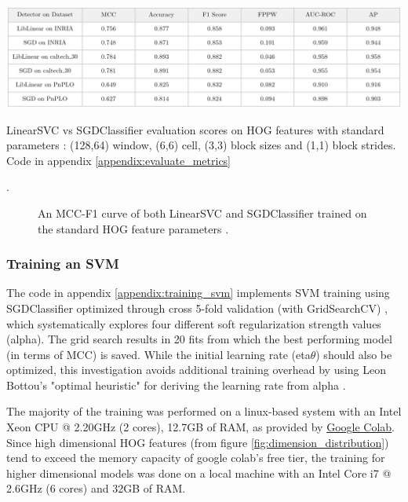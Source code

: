 \begin{table}
    \includegraphics[width=\linewidth]{images/liblinear_vs_sgd_table.png}
    \caption{LinearSVC vs SGDClassifier evaluation scores on HOG features with standard parameters \cite{dalal_2005_histograms}: (128,64) window, (6,6) cell, (3,3) block sizes and (1,1) block strides. Code in appendix \ref{appendix:evaluate_metrics}}
    \label{tab:liblinear_vs_sgd_table}. 
\end{table}


\begin{figure}
    \centering
    
    \caption{An MCC-F1 curve of both LinearSVC and SGDClassifier trained on the standard HOG feature parameters \cite{dalal_2005_histograms}. \protect\footnotemark}
    \label{fig:liblinear_vs_sgd_curve}
\end{figure}


\subsubsection{Training an SVM}

The code in appendix \ref{appendix:training_svm} implements SVM training using SGDClassifier optimized through cross 5-fold validation (with GridSearchCV) \cite{cornell_hyperoptimization}, which systematically explores four different soft regularization strength values (alpha). The grid search results in 20 fits from which the best performing model (in terms of MCC) is saved. While the initial learning rate (eta$\theta$) should also be optimized, this investigation avoids additional training overhead by using Leon Bottou's "optimal heuristic" for deriving the learning rate from alpha \cite{sgd_leon}.

The majority of the training was performed on a linux-based system with an Intel Xeon CPU @ 2.20GHz (2 cores), 12.7GB of RAM, as provided by \href{https://colab.research.google.com/}{Google Colab}. Since high dimensional HOG features (from figure \ref{fig:dimension_distribution}) tend to exceed the memory capacity of google colab's free tier, the training for higher dimensional models was done on a local machine with an Intel Core i7 @ 2.6GHz (6 cores) and 32GB of RAM.

